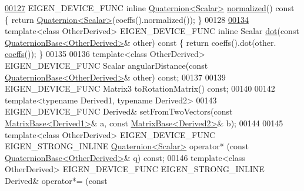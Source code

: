 \begin{DoxyCode}
\hyperlink{group___geometry___module_af07bcd396dd08136fe4fbbdb182da70f}{00127}   EIGEN\_DEVICE\_FUNC \textcolor{keyword}{inline} \hyperlink{group___geometry___module_class_eigen_1_1_quaternion}{Quaternion<Scalar>} \hyperlink{group___geometry___module_af07bcd396dd08136fe4fbbdb182da70f}{normalized}()\textcolor{keyword}{ const }\{ \textcolor{keywordflow}{return} 
      \hyperlink{group___geometry___module_class_eigen_1_1_quaternion}{Quaternion<Scalar>}(coeffs().normalized()); \}
00128 
\hyperlink{group___geometry___module_aa95c422b3d12869ed6aa46e4dd5a430a}{00134}   \textcolor{keyword}{template}<\textcolor{keyword}{class} OtherDerived> EIGEN\_DEVICE\_FUNC \textcolor{keyword}{inline} Scalar \hyperlink{group___geometry___module_aa95c422b3d12869ed6aa46e4dd5a430a}{dot}(\textcolor{keyword}{const} 
      \hyperlink{group___geometry___module_class_eigen_1_1_quaternion_base}{QuaternionBase<OtherDerived>}& other)\textcolor{keyword}{ const }\{ \textcolor{keywordflow}{return} coeffs().dot(other.
      \hyperlink{group___geometry___module_aa7bb3fc337ffa82b0ad795783eb8a2ce}{coeffs}()); \}
00135 
00136   \textcolor{keyword}{template}<\textcolor{keyword}{class} OtherDerived> EIGEN\_DEVICE\_FUNC Scalar angularDistance(\textcolor{keyword}{const} 
      \hyperlink{group___geometry___module_class_eigen_1_1_quaternion_base}{QuaternionBase<OtherDerived>}& other) \textcolor{keyword}{const};
00137 
00139   EIGEN\_DEVICE\_FUNC Matrix3 toRotationMatrix() \textcolor{keyword}{const};
00140 
00142   \textcolor{keyword}{template}<\textcolor{keyword}{typename} Derived1, \textcolor{keyword}{typename} Derived2>
00143   EIGEN\_DEVICE\_FUNC Derived& setFromTwoVectors(\textcolor{keyword}{const} \hyperlink{group___core___module_class_eigen_1_1_matrix_base}{MatrixBase<Derived1>}& a, \textcolor{keyword}{const} 
      \hyperlink{group___core___module_class_eigen_1_1_matrix_base}{MatrixBase<Derived2>}& b);
00144 
00145   \textcolor{keyword}{template}<\textcolor{keyword}{class} OtherDerived> EIGEN\_DEVICE\_FUNC EIGEN\_STRONG\_INLINE 
      \hyperlink{group___geometry___module_class_eigen_1_1_quaternion}{Quaternion<Scalar>} operator* (\textcolor{keyword}{const} 
      \hyperlink{group___geometry___module_class_eigen_1_1_quaternion_base}{QuaternionBase<OtherDerived>}& q) \textcolor{keyword}{const};
00146   \textcolor{keyword}{template}<\textcolor{keyword}{class} OtherDerived> EIGEN\_DEVICE\_FUNC EIGEN\_STRONG\_INLINE Derived& operator*= (\textcolor{keyword}{const} 

\end{DoxyCode}
